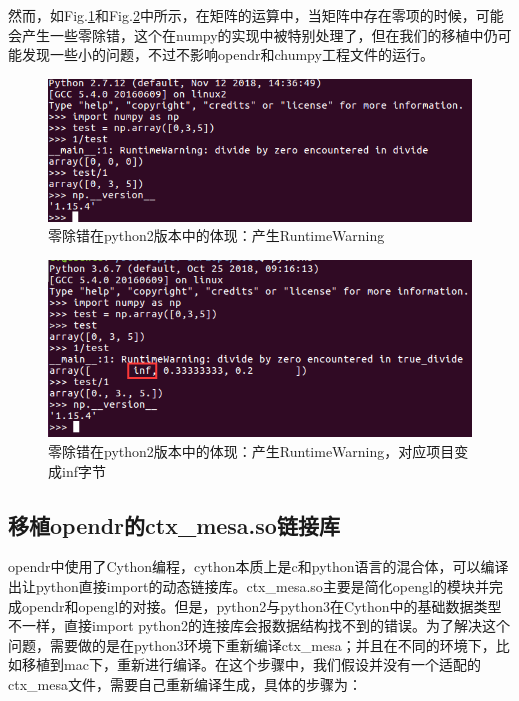 \documentclass{article}
\begin{document}
然而，如Fig.\ref{python2_div0}和Fig.\ref{python3_div0}中所示，在矩阵的运算中，当矩阵中存在零项的时候，可能会产生一些零除错，这个在numpy的实现中被特别处理了，但在我们的移植中仍可能发现一些小的问题，不过不影响opendr和chumpy工程文件的运行。

\begin{figure}[H]
	\centering
	\includegraphics[width=14cm]{figure/python2_div0.png}
	\caption{零除错在python2版本中的体现：产生RuntimeWarning}
	\label{python2_div0}
\end{figure}

\begin{figure}[H]
	\centering
	\includegraphics[width=14cm]{figure/python3_div0.png}
	\caption{零除错在python2版本中的体现：产生RuntimeWarning，对应项目变成inf字节}
	\label{python3_div0}
\end{figure}

\subsection{移植opendr的ctx\_mesa.so链接库}
opendr中使用了Cython编程，cython本质上是c和python语言的混合体，可以编译出让python直接import的动态链接库。ctx\_mesa.so主要是简化opengl的模块并完成opendr和opengl的对接。但是，python2与python3在Cython中的基础数据类型不一样，直接import python2的连接库会报数据结构找不到的错误。为了解决这个问题，需要做的是在python3环境下重新编译ctx\_mesa；并且在不同的环境下，比如移植到mac下，重新进行编译。在这个步骤中，我们假设并没有一个适配的ctx\_mesa文件，需要自己重新编译生成，具体的步骤为：
\end{document}
